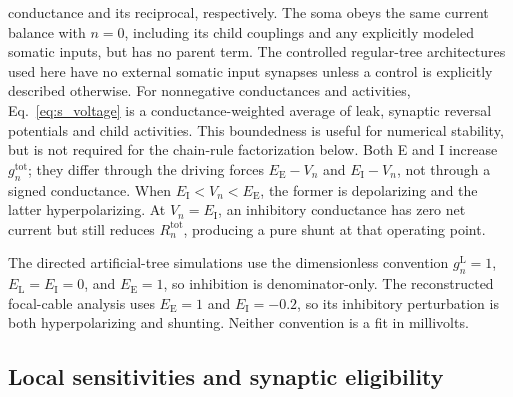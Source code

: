conductance and its reciprocal, respectively. The soma obeys the same current balance with $n=0$, including its child
couplings and any explicitly modeled somatic inputs, but has no parent term.
The controlled regular-tree architectures used here have no external somatic
input synapses unless a control is explicitly described otherwise.
For nonnegative conductances and activities, Eq.~\ref{eq:s_voltage} is a
conductance-weighted average of leak, synaptic reversal potentials and child
activities. This boundedness is useful for numerical stability, but is not
required for the chain-rule factorization below. Both E and I increase
\(g_n^{\mathrm{tot}}\); they differ through the driving forces
\(E_{\mathrm E}-V_n\) and \(E_{\mathrm I}-V_n\), not through a signed
conductance. When \(E_{\mathrm I}<V_n<E_{\mathrm E}\), the former is
depolarizing and the latter hyperpolarizing. At \(V_n=E_{\mathrm I}\), an
inhibitory conductance has zero net current but still reduces
\(R_n^{\mathrm{tot}}\), producing a pure shunt at that operating point.

The directed artificial-tree simulations use the dimensionless convention
\(g_n^{\mathrm L}=1\), \(E_{\mathrm L}=E_{\mathrm I}=0\), and
\(E_{\mathrm E}=1\), so inhibition is denominator-only. The reconstructed
focal-cable analysis uses \(E_{\mathrm E}=1\) and
\(E_{\mathrm I}=-0.2\), so its inhibitory perturbation is both
hyperpolarizing and shunting. Neither convention is a fit in millivolts.

\subsection{Local sensitivities and synaptic eligibility}

